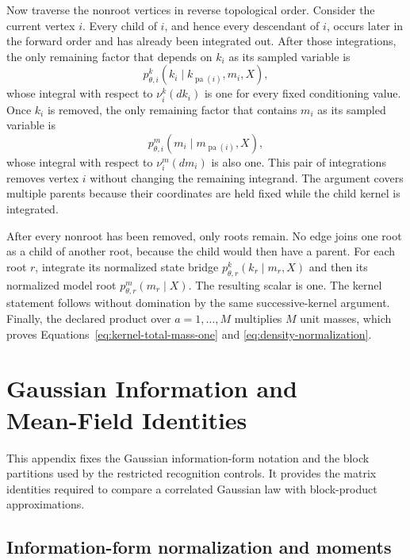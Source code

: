 Now traverse the nonroot vertices in reverse topological order. Consider the current vertex \(i\). Every child of \(i\), and hence every descendant of \(i\), occurs later in the forward order and has already been integrated out. After those integrations, the only remaining factor that depends on \(k_i\) as its sampled variable is
\begin{equation}
p_{\theta,i}^{k}(k_i\mid k_{\operatorname{pa}(i)},m_i,X),
\end{equation}
whose integral with respect to \(\nu_i^k(dk_i)\) is one for every fixed conditioning value. Once \(k_i\) is removed, the only remaining factor that contains \(m_i\) as its sampled variable is
\begin{equation}
p_{\theta,i}^{m}(m_i\mid m_{\operatorname{pa}(i)},X),
\end{equation}
whose integral with respect to \(\nu_i^m(dm_i)\) is also one. This pair of integrations removes vertex \(i\) without changing the remaining integrand. The argument covers multiple parents because their coordinates are held fixed while the child kernel is integrated.

After every nonroot has been removed, only roots remain. No edge joins one root as a child of another root, because the child would then have a parent. For each root \(r\), integrate its normalized state bridge \(p_{\theta,r}^{k}(k_r\mid m_r,X)\) and then its normalized model root \(p_{\theta,r}^{m}(m_r\mid X)\). The resulting scalar is one. The kernel statement follows without domination by the same successive-kernel argument. Finally, the declared product over \(a=1,\ldots,M\) multiplies \(M\) unit masses, which proves Equations~\eqref{eq:kernel-total-mass-one} and \eqref{eq:density-normalization}.

\chapter[Gaussian Information and Mean-Field Identities]{Gaussian Information and\\Mean-Field Identities}

This appendix fixes the Gaussian information-form notation and the block partitions used by the restricted recognition controls. It provides the matrix identities required to compare a correlated Gaussian law with block-product approximations.

\section{Information-form normalization and moments}
\label{sec:gaussian-information-normalization}

